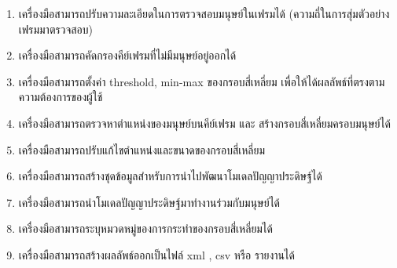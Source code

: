 \begin{enumerate}
	\item เครื่องมือสามารถปรับความละเอียดในการตรวจสอบมนุษย์ในเฟรมได้ (ความถี่ในการสุ่มตัวอย่างเฟรมมาตรวจสอบ)
	\item เครื่องมือสามารถคัดกรองคีย์เฟรมที่ไม่มีมนุษย์อยู่ออกได้
	\item เครื่องมือสามารถตั้งค่า threshold, min-max ของกรอบสี่เหลี่ยม เพื่อให้ได้ผลลัพธ์ที่ตรงตามความต้องการของผู้ใช้
	\item เครื่องมือสามารถตรวจหาตำแหน่งของมนุษย์บนคีย์เฟรม และ สร้างกรอบสี่เหลี่ยมครอบมนุษย์ได้
	\item เครื่องมือสามารถปรับแก้ไขตำแหน่งและขนาดของกรอบสี่เหลี่ยม
	\item เครื่องมือสามารถสร้างชุดข้อมูลสำหรับการนำไปพัฒนาโมเดลปัญญาประดิษฐ์ได้
	\item เครื่องมือสามารถนำโมเดลปัญญาประดิษฐ์มาทำงานร่วมกับมนุษย์ได้
	\item เครื่องมือสามารถระบุหมวดหมู่ของการกระทำของกรอบสี่เหลี่ยมได้
	\item เครื่องมือสามารถสร้างผลลัพธ์ออกเป็นไฟล์ xml , csv หรือ รายงานได้
\end{enumerate}